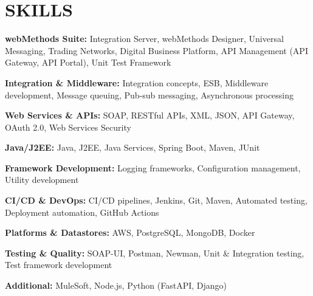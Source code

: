 \documentclass[letterpaper,11pt]{article}
\begin{document}
\section{\color{airforceblue}SKILLS}
 \begin{itemize}[leftmargin=0in, label={}]
    \small{\item{
     \textbf{\normalsize{webMethods Suite:}}{ \normalsize{Integration Server, webMethods Designer, Universal Messaging, Trading Networks, Digital Business Platform, API Management (API Gateway, API Portal), Unit Test Framework}} \\
      \vspace{1.2pt}
      
     \textbf{\normalsize{Integration \& Middleware:}}{ \normalsize{Integration concepts, ESB, Middleware development, Message queuing, Pub-sub messaging, Asynchronous processing}} \\
      \vspace{1.2pt}
      
     \textbf{\normalsize{Web Services \& APIs:}}{ \normalsize{SOAP, RESTful APIs, XML, JSON, API Gateway, OAuth 2.0, Web Services Security}} \\
      \vspace{1.2pt}
      
     \textbf{\normalsize{Java/J2EE:}}{ \normalsize{Java, J2EE, Java Services, Spring Boot, Maven, JUnit}} \\
      \vspace{1.2pt}
      
     \textbf{\normalsize{Framework Development:}}{ \normalsize{Logging frameworks, Configuration management, Utility development}} \\
      \vspace{1.2pt}
      
     \textbf{\normalsize{CI/CD \& DevOps:}}{ \normalsize{CI/CD pipelines, Jenkins, Git, Maven, Automated testing, Deployment automation, GitHub Actions}} \\
      \vspace{1.2pt}
      
     \textbf{\normalsize{Platforms \& Datastores:}}{ \normalsize{AWS, PostgreSQL, MongoDB, Docker}} \\
      \vspace{1.2pt}
      
     \textbf{\normalsize{Testing \& Quality:}}{ \normalsize{SOAP-UI, Postman, Newman, Unit \& Integration testing, Test framework development}} \\
      \vspace{1.2pt}
      
     \textbf{\normalsize{Additional:}}{ \normalsize{MuleSoft, Node.js, Python (FastAPI, Django)}}
     }}
 \end{itemize}
 \vspace{-16pt}
\end{document}

